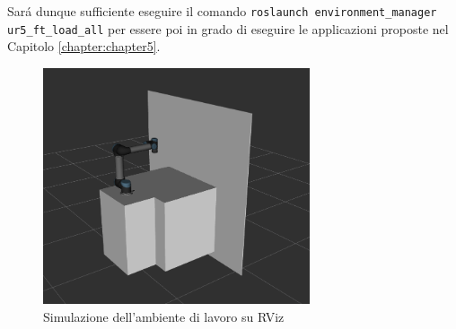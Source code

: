 Sar\'{a} dunque sufficiente eseguire il comando \verb|roslaunch environment_manager ur5_ft_load_all| per essere poi in grado di 
eseguire le applicazioni proposte nel Capitolo \ref{chapter:chapter5}. 
\begin{figure}[H]
    \centering
    \includegraphics*[width=0.70\textwidth]{images/workcell.png}
    \caption{Simulazione dell'ambiente di lavoro su RViz}
    \label{fig:workcell}
\end{figure}